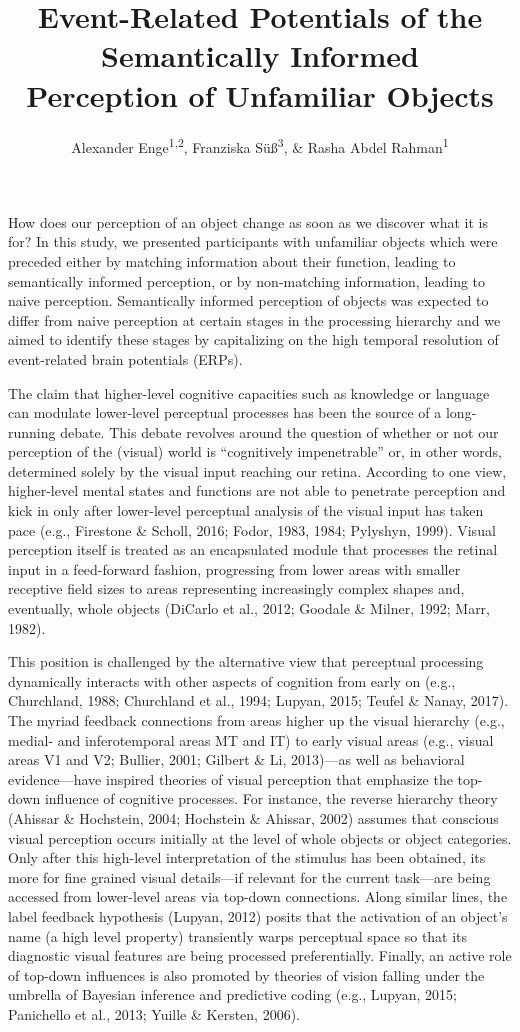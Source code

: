 \documentclass[
  english,
  man,floatsintext]{apa7}
\title{Event-Related Potentials of the Semantically Informed\\
Perception of Unfamiliar Objects}
\author{Alexander Enge\textsuperscript{1,2}, Franziska Süß\textsuperscript{3}, \& Rasha Abdel Rahman\textsuperscript{1}}
\date{}
\affiliation{\vspace{0.5cm}\textsuperscript{1} Humboldt-Universität zu Berlin\\\textsuperscript{2} Max Planck Institute for Human Cognitive and Brain Sciences\\\textsuperscript{3} Fachhochschule des Mittelstands}
\begin{document}
\maketitle

How does our perception of an object change as soon as we discover what it is for? In this study, we presented participants with unfamiliar objects which were preceded either by matching information about their function, leading to semantically informed perception, or by non-matching information, leading to naive perception. Semantically informed perception of objects was expected to differ from naive perception at certain stages in the processing hierarchy and we aimed to identify these stages by capitalizing on the high temporal resolution of event-related brain potentials (ERPs).

The claim that higher-level cognitive capacities such as knowledge or language can modulate lower-level perceptual processes has been the source of a long-running debate. This debate revolves around the question of whether or not our perception of the (visual) world is \enquote{cognitively impenetrable} or, in other words, determined solely by the visual input reaching our retina. According to one view, higher-level mental states and functions are not able to penetrate perception and kick in only after lower-level perceptual analysis of the visual input has taken pace (e.g., Firestone \& Scholl, 2016; Fodor, 1983, 1984; Pylyshyn, 1999). Visual perception itself is treated as an encapsulated module that processes the retinal input in a feed-forward fashion, progressing from lower areas with smaller receptive field sizes to areas representing increasingly complex shapes and, eventually, whole objects (DiCarlo et al., 2012; Goodale \& Milner, 1992; Marr, 1982).

This position is challenged by the alternative view that perceptual processing dynamically interacts with other aspects of cognition from early on (e.g., Churchland, 1988; Churchland et al., 1994; Lupyan, 2015; Teufel \& Nanay, 2017). The myriad feedback connections from areas higher up the visual hierarchy (e.g., medial- and inferotemporal areas MT and IT) to early visual areas (e.g., visual areas V1 and V2; Bullier, 2001; Gilbert \& Li, 2013)---as well as behavioral evidence---have inspired theories of visual perception that emphasize the top-down influence of cognitive processes. For instance, the reverse hierarchy theory (Ahissar \& Hochstein, 2004; Hochstein \& Ahissar, 2002) assumes that conscious visual perception occurs initially at the level of whole objects or object categories. Only after this high-level interpretation of the stimulus has been obtained, its more for fine grained visual details---if relevant for the current task---are being accessed from lower-level areas via top-down connections. Along similar lines, the label feedback hypothesis (Lupyan, 2012) posits that the activation of an object's name (a high level property) transiently warps perceptual space so that its diagnostic visual features are being processed preferentially. Finally, an active role of top-down influences is also promoted by theories of vision falling under the umbrella of Bayesian inference and predictive coding (e.g., Lupyan, 2015; Panichello et al., 2013; Yuille \& Kersten, 2006).
\end{document}
